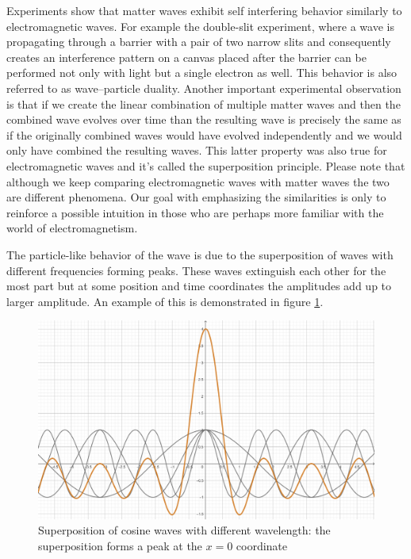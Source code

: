 Experiments show that matter waves exhibit self interfering behavior similarly to electromagnetic waves.
For example the double-slit experiment, where a wave is propagating through a barrier with a pair of two narrow slits and consequently creates an interference pattern on a canvas placed after the barrier can be performed not only with light but a single electron as well.
This behavior is also referred to as wave–particle duality.
Another important experimental observation is that if we create the linear combination of multiple matter waves and then the combined wave evolves over time than the resulting wave is precisely the same as if the originally combined waves would have evolved independently and we would only have combined the resulting waves.
This latter property was also true for electromagnetic waves and it's called the superposition principle.
Please note that although we keep comparing electromagnetic waves with matter waves the two are different phenomena.
Our goal with emphasizing the similarities is only to reinforce a possible intuition in those who are perhaps more familiar with the world of electromagnetism.

The particle-like behavior of the wave is due to the superposition of waves with different frequencies forming peaks.
These waves extinguish each other for the most part but at some position and time coordinates the amplitudes add up to larger amplitude.
An example of this is demonstrated in figure \ref{fig:superposition}.
\begin{figure}
	\centering
	\includegraphics{figures/Superposition of cosine waves.png}
	\caption{Superposition of cosine waves with different wavelength: the superposition forms a peak at the $x = 0$ coordinate}
	\label{fig:superposition}
\end{figure}

